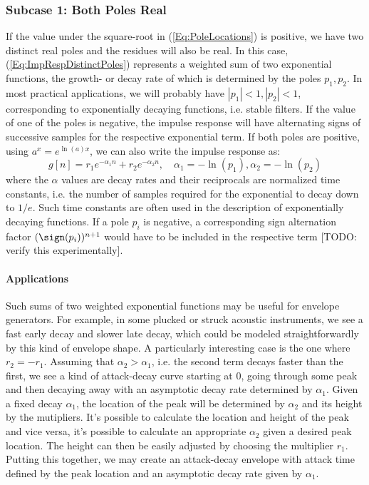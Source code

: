 \subsubsection{Subcase 1: Both Poles Real}
If the value under the square-root in (\ref{Eq:PoleLocations}) is positive, we have two distinct real poles and the residues will also be real. In this case, (\ref{Eq:ImpRespDistinctPoles}) represents a weighted sum of two exponential functions, the growth- or decay rate of which is determined by the poles $p_1, p_2$. In most practical applications, we will probably have $|p_1| < 1, |p_2| < 1$, corresponding to exponentially decaying functions, i.e. stable filters. If the value of one of the poles is negative, the impulse response will have alternating signs of successive samples for the respective exponential term. If both poles are positive, using $a^x = e^{\ln(a) x}$, we can also write the impulse response as:
\begin{equation}
 g[n] = r_1 e^{-\alpha_1 n} + r_2 e^{-\alpha_2 n}, \quad \alpha_1 = -\ln(p_1), \alpha_2 = -\ln(p_2)
\end{equation}
where the $\alpha$ values are decay rates and their reciprocals are normalized time constants, i.e. the number of samples required for the exponential to decay down to $1/e$. Such time constants are often used in the description of exponentially decaying functions. If a pole $p_i$ is negative, a corresponding sign alternation factor $(\sign(p_i))^{n+1}$ would have to be included in the respective term [TODO: verify this experimentally].

\paragraph{Applications}
Such sums of two weighted exponential functions may be useful for envelope generators. For example, in some plucked or struck acoustic instruments, we see a fast early decay and slower late decay, which could be modeled straightforwardly by this kind of envelope shape. A particularly interesting case is the one where $r_2 = -r_1$. Assuming that $\alpha_2 > \alpha_1$, i.e. the second term decays faster than the first, we see a kind of attack-decay curve starting at $0$, going through some peak and then decaying away with an asymptotic decay rate determined by $\alpha_1$. Given a fixed decay $\alpha_1$, the location of the peak will be determined by $\alpha_2$ and its height by the mutipliers. It's possible to calculate the location and height of the peak and vice versa, it's possible to calculate an appropriate $\alpha_2$ given a desired peak location. The height can then be easily adjusted by choosing the multiplier $r_1$. Putting this together, we may create an attack-decay envelope with attack time defined by the peak location and an asymptotic decay rate given by $\alpha_1$.

